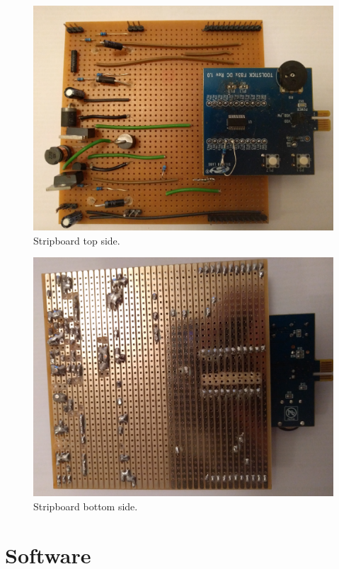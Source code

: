 \documentclass[12pt]{article}%
\begin{document}
\begin{figure}[H]
	\centering
  	\includegraphics[width=16cm]{top.jpg}
  	\caption{Stripboard top side.}
  	\label{fig:top}
\end{figure}

\begin{figure}[H]
	\centering
  	\includegraphics[width=16cm]{bot.jpg}
  	\caption{Stripboard bottom side.}
  	\label{fig:bot}
\end{figure}

\section{Software}
\end{document}
